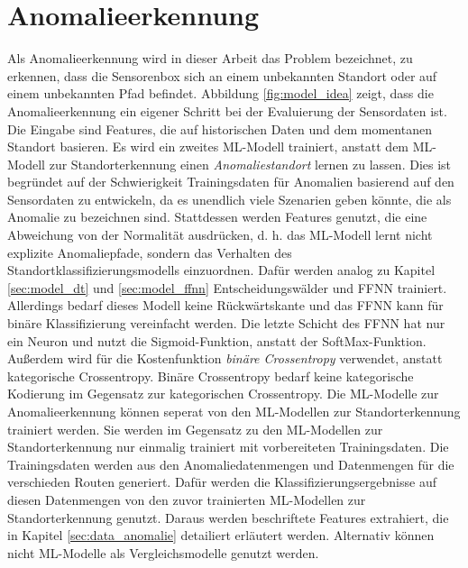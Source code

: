 \newpage
\section{Anomalieerkennung}
Als Anomalieerkennung wird in dieser Arbeit das Problem bezeichnet, zu erkennen, dass die Sensorenbox sich an einem
unbekannten Standort oder auf einem unbekannten Pfad befindet.
Abbildung \ref{fig:model_idea} zeigt, dass die Anomalieerkennung ein eigener Schritt bei der Evaluierung der Sensordaten ist.
Die Eingabe sind Features, die auf historischen Daten und dem momentanen Standort basieren.
\newline
\newline
Es wird ein zweites ML-Modell trainiert, anstatt dem ML-Modell zur Standorterkennung einen \textit{Anomaliestandort} lernen zu lassen.
Dies ist begründet auf der Schwierigkeit Trainingsdaten für Anomalien basierend auf den Sensordaten zu entwickeln,
da es unendlich viele Szenarien geben könnte, die als Anomalie zu bezeichnen sind.
Stattdessen werden Features genutzt, die eine Abweichung von der Normalität ausdrücken,
d. h. das ML-Modell lernt nicht explizite Anomaliepfade, sondern das Verhalten des Standortklassifizierungsmodells einzuordnen.
\newline
\newline
Dafür werden analog zu Kapitel \ref{sec:model_dt} und \ref{sec:model_ffnn} Entscheidungswälder und FFNN trainiert.
Allerdings bedarf dieses Modell keine Rückwärtskante und das FFNN kann für binäre Klassifizierung vereinfacht werden.
Die letzte Schicht des FFNN hat nur ein Neuron und nutzt die Sigmoid-Funktion, anstatt der SoftMax-Funktion.
Außerdem wird für die Kostenfunktion \textit{binäre Crossentropy} verwendet, anstatt kategorische Crossentropy.
Binäre Crossentropy bedarf keine kategorische Kodierung im Gegensatz zur kategorischen Crossentropy.
\newline
\newline
Die ML-Modelle zur Anomalieerkennung können seperat von den ML-Modellen zur Standorterkennung trainiert werden.
Sie werden im Gegensatz zu den ML-Modellen zur Standorterkennung nur einmalig trainiert mit vorbereiteten Trainingsdaten.
Die Trainingsdaten werden aus den Anomaliedatenmengen und Datenmengen für die verschieden Routen generiert.
Dafür werden die Klassifizierungsergebnisse auf diesen Datenmengen von den zuvor trainierten ML-Modellen zur Standorterkennung genutzt.
Daraus werden beschriftete Features extrahiert, die in Kapitel \ref{sec:data_anomalie} detailiert erläutert werden.
\newpage
Alternativ können nicht ML-Modelle als Vergleichsmodelle genutzt werden.
